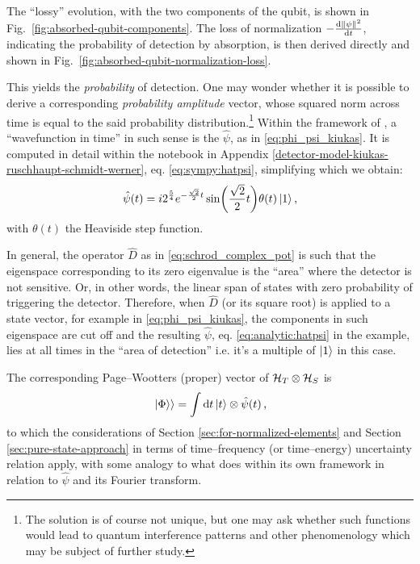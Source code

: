The ``lossy'' evolution, with the two components of the qubit, is shown in Fig.~\ref{fig:absorbed-qubit-components}.
The loss of normalization $-\dv{\norm{\psi}^2}{t}$, indicating the probability of detection by absorption,
is then derived directly and shown in Fig.~\ref{fig:absorbed-qubit-normalization-loss}.

This yields the \emph{probability} of detection.
One may wonder whether it is possible to derive a corresponding \emph{probability amplitude} vector,
whose squared norm across time is equal to the said probability distribution.\footnote{
  The solution is of course not unique, but one may ask whether such functions would lead
  to quantum interference patterns and other phenomenology which may be subject of further study.
}
Within the framework of \cite{RuschhauptAbsorption}, a ``wavefunction in time'' in such sense
is the $\hat{\psi}$, as in \eqref{eq:phi_psi_kiukas}.
It is computed in detail within the
notebook in Appendix \ref{detector-model-kiukas-ruschhaupt-schmidt-werner}, eq. \eqref{eq:sympy:hatpsi},
simplifying which we obtain:
\begin{equation}\label{eq:analytic:hatpsi}
  \hat{\psi}(t) =
    i 2^{\frac{5}{4}} e^{-\frac{\sqrt{2}}{2}t}\sin(\frac{\sqrt{2}}{2}t) \theta(t)
    \ket{1}
    \text{,}
\end{equation}
with $\theta(t)$ the Heaviside step function.

\begin{remark}\label{remark:detection_area}
In general, the operator $\hat{D}$ as in \eqref{eq:schrod_complex_pot}
is such that the eigenspace corresponding to its zero eigenvalue
is the ``area'' where the detector is not sensitive. Or, in other words,
the linear span of states with zero probability of triggering the detector.
Therefore, when $\hat{D}$ (or its square root) is applied to a state vector,
for example in \eqref{eq:phi_psi_kiukas},
the components in such eigenspace are cut off and the resulting
$\hat{\psi}$, eq. \eqref{eq:analytic:hatpsi} in the example, lies at all times in the ``area of detection''
i.e. it's a multiple of $\ket{1}$ in this case.
\end{remark}

The corresponding Page--Wootters (proper) vector of $\mathcal{H}_T \otimes \mathcal{H}_S$ is
\begin{equation}\label{eq:hatpsi:pw}
  \left.\left| \Phi \right\rangle\right\rangle = \int \dd{t} \ket{t} \otimes \hat{\psi}(t) \,\text{,}
\end{equation}
to which the considerations of Section \ref{sec:for-normalized-elements}
and Section \ref{sec:pure-state-approach} in terms of time--frequency
(or time--energy) uncertainty relation apply, with some analogy
to what \cite{RuschhauptAbsorption} does within its own framework
in relation to $\hat{\psi}$ and its Fourier transform.

